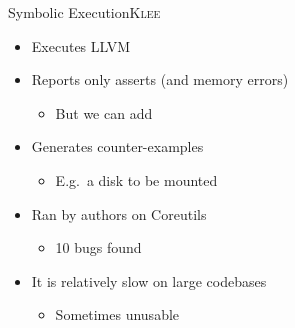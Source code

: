 \begin{frame}{Symbolic Execution}{\textsc{Klee}}

  \begin{itemize}
    \item Executes LLVM

    \pause

    \item Reports only asserts (and memory errors)
    \begin{itemize}
      \item But we can add 
    \end{itemize}

    \pause

    \item Generates counter-examples
    \begin{itemize}
      \item E.g.\ a disk to be mounted
    \end{itemize}

    \pause

    \item Ran by authors on Coreutils
    \begin{itemize}
      \item 10 bugs found
    \end{itemize}

    \pause

    \item It is relatively slow on large codebases
    \begin{itemize}
      \item Sometimes unusable
    \end{itemize}
  \end{itemize}

\end{frame}

